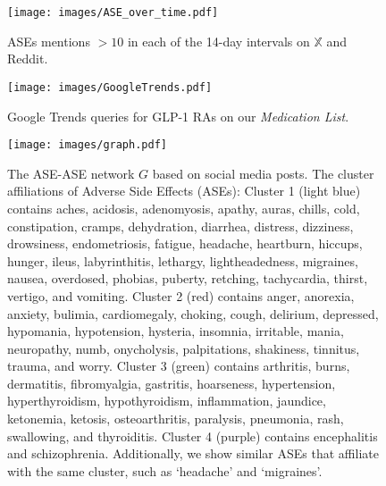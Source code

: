\documentclass[referee,bst/sn-basic]{sn-jnl}%
\begin{document}
\begin{figure}[H]
    \centering
    \texttt{[image: images/ASE\_over\_time.pdf]}
    \caption{ASEs mentions $> 10$ in each of the 14-day intervals on $\mathbb{X}$ and Reddit. 
    }
    \label{fig:ASE_over_time}
\end{figure} 



\begin{figure}[H]
    \centering
    \texttt{[image: images/GoogleTrends.pdf]}
    \caption{Google Trends queries for GLP-1 RAs on our \textit{Medication List}.
        } 
    \label{fig:Gtrends}
\end{figure} 


 \begin{figure}[H]
    \centering
    \texttt{[image: images/graph.pdf]}
    \caption{The ASE-ASE network $G$ based on social media posts.
    The cluster affiliations of Adverse Side Effects (ASEs):
Cluster 1 (light blue) contains 
aches, acidosis, adenomyosis, apathy, auras, chills, cold, constipation, cramps, dehydration, diarrhea, distress, dizziness, drowsiness, endometriosis, fatigue, headache, heartburn, hiccups, hunger, ileus, labyrinthitis, lethargy, lightheadedness, migraines, nausea, overdosed, phobias, puberty, retching, tachycardia, thirst, vertigo, and vomiting. 
%
Cluster 2 (red) contains 
anger, anorexia, anxiety, bulimia, cardiomegaly, choking, cough, delirium, depressed, hypomania, hypotension, hysteria, insomnia, irritable, mania, neuropathy, numb, onycholysis, palpitations, shakiness, tinnitus, trauma, and worry. 
%
Cluster 3 (green) contains 
arthritis, burns, dermatitis, fibromyalgia, gastritis, hoarseness, hypertension, hyperthyroidism, hypothyroidism, inflammation, jaundice, ketonemia, ketosis, osteoarthritis, paralysis, pneumonia, rash, swallowing, and thyroiditis. 
%
Cluster 4 (purple) contains 
encephalitis and schizophrenia.
%
Additionally, we show similar ASEs that affiliate with the same cluster, such as `headache' and `migraines'.
    }
    \label{fig:graph}
\end{figure}
\end{document}
